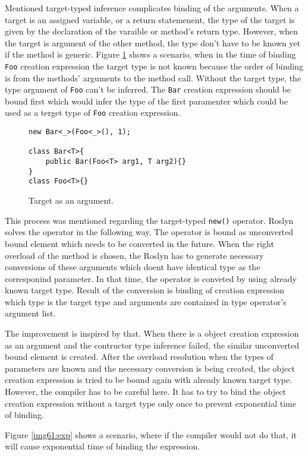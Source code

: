 Mentioned target-typed inference complicates binding of the arguments.
When a target is an assigned variable, or a return statemenent, the type of the target is given by the declaration of the varaible or method's return type.
However, when the target is argument of the other method, the type don't have to be known yet if the method is generic.
Figure \ref{img60:target} shows a scenario, when in the time of binding \texttt{Foo} creation expression the target type is not known because the order of binding is from the methods' arguments to the method call.
Without the target type, the type argument of \texttt{Foo} can't be inferred.
The \texttt{Bar} creation expression should be bound first which would infer the type of the first paramenter which could be used as a terget type of \texttt{Foo} creation expression.
\begin{figure}[h!]
\begin{lstlisting}[style=csharp, mathescape=true]
new Bar<_>(Foo<_>(), 1);

class Bar<T>{
    public Bar(Foo<T> arg1, T arg2){}
}
class Foo<T>{}
\end{lstlisting}
\caption{Target as an argument.}
\label{img60:target}
\end{figure}
\par
This process was mentioned regarding the target-typed \texttt{new()} operator.
Roslyn solves the operator in the following way.
The operator is bound as unconverted bound element which needs to be converted in the future.
When the right overload of the method is chosen, the Roslyn has to generate necessary conversions of these arguments which doent have identical type as the corresponind parameter.
In that time, the operator is conveted by using already known target type.
Result of the conversion is binding of creation expression which type is the target type and arguments are contained in type operator's argument list.
\par
The improvement is inspired by that.
When there is a object creation expression as an argument and the contructor type inference failed, the similar unconverted bound element is created.
After the overload resolution when the types of parameters are known and the necessary conversion is being created, the object creation expression is tried to be bound again with already known target type.
However, the compiler has to be careful here.
It has to try to bind the object creation expression without a target type only once to prevent exponential time of binding.
\par
Figure \ref{img61:exp} shows a scenario, where if the compiler would not do that, it will cause exponential time of binding the expression.

